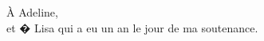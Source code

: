 \documentclass[12pt, a4paper, french]{thesul}
\begin{document}

\renewcommand{\AnimateOnline}{{}}



\addtolength{\headheight}{1.6pt}
\addtolength{\footskip}{1.6pt}

\begin{ThesisDedication}
\`A Adeline,\\
et � Lisa qui a eu un an le jour de ma soutenance.
\end{ThesisDedication}

\tableofcontents

        
\mainmatter

%

\end{document}

